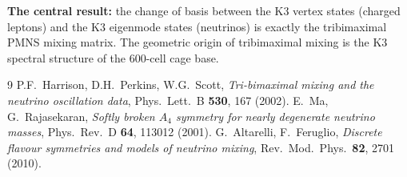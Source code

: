 \documentclass[11pt]{article}
\begin{document}
\bigskip
\noindent\textbf{The central result:} the change of basis between the
K3 vertex states (charged leptons) and the K3 eigenmode states
(neutrinos) is exactly the tribimaximal PMNS mixing matrix.  The
geometric origin of tribimaximal mixing is the K3 spectral structure
of the 600-cell cage base.

\begin{thebibliography}{9}
P.F.~Harrison, D.H.~Perkins, W.G.~Scott,
\textit{Tri-bimaximal mixing and the neutrino oscillation data},
Phys.\ Lett.\ B \textbf{530}, 167 (2002).
E.~Ma, G.~Rajasekaran,
\textit{Softly broken $A_4$ symmetry for nearly degenerate neutrino masses},
Phys.\ Rev.\ D \textbf{64}, 113012 (2001).
G.~Altarelli, F.~Feruglio,
\textit{Discrete flavour symmetries and models of neutrino mixing},
Rev.\ Mod.\ Phys.\ \textbf{82}, 2701 (2010).
\end{thebibliography}
\end{document}
